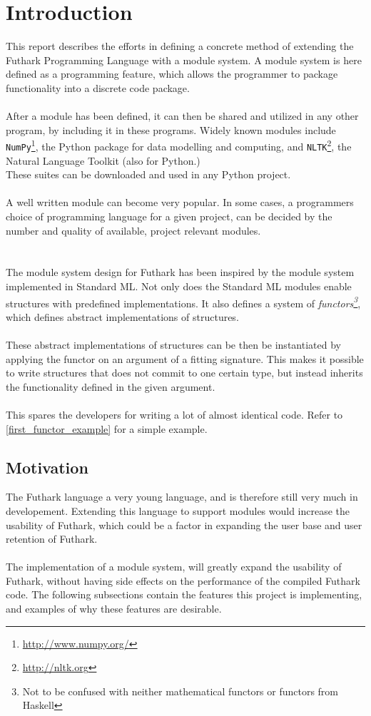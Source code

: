 \section{Introduction}
\label{sec:introduction}
This report describes the efforts in defining a concrete method of extending the Futhark Programming Language with a module system.
A module system is here defined as a programming feature,
which allows the programmer to package functionality into a discrete code
package.
\\\\
After a module has been defined, it can then be shared and utilized in any other
program, by including it in these programs. Widely known modules include
\texttt{NumPy}\footnote{\url{http://www.numpy.org/}}, the Python package for
data modelling and computing, and \texttt{NLTK}\footnote{\url{http://nltk.org}},
the Natural Language Toolkit (also for Python.)
\\
These suites can be downloaded and used in any Python project.
\\
\\
A well written module can become very popular. In some cases, a programmers
choice of programming language for a given project, can be decided by the number and quality of
available, project relevant modules.
\\
\\
\\
The module system design for Futhark has been inspired by the module system
implemented in Standard ML\cite{crash_course}. Not only does the Standard ML
modules enable structures with predefined implementations.
It also defines a system of \textit{functors\footnote{Not to be confused with neither mathematical
  functors or functors from Haskell}}, which defines abstract implementations of
structures.
\\
\\
These abstract implementations of structures can be then be instantiated by
applying the functor on an argument of a fitting signature.
This makes it
possible to write structures that does not commit to one certain type, but
instead inherits the functionality defined in the given argument.
\\
\\
This spares the developers for writing a lot of almost identical code. Refer to
\ref{first_functor_example} for a simple example.
\pagebreak
\subsection{Motivation}
\label{subsec:label}
The Futhark language a very young language, and is therefore still very much in
developement.
Extending this language to support modules would increase the usability of
Futhark, which could be a factor in expanding the user base and user retention
of Futhark.
\\
\\
The implementation of a module system, will greatly expand the usability of
Futhark, without having side effects on the performance of the compiled Futhark code.
The following subsections contain the features this project is implementing, and
examples of why these features are desirable.
